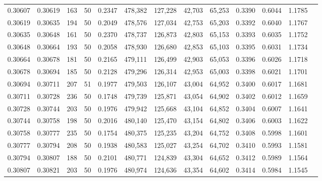 \begin{tabular}{rrrrrrrrrrrrr}
0.30607 & 0.30619 &   163 &  50 &                                     0.2347 & 478,382 & 127,228 &  42,703 &  65,253 & 0.3390 & 0.6044 & 1.1785 \\
0.30619 & 0.30635 &   194 &  50 &                                     0.2049 & 478,576 & 127,034 &  42,753 &  65,203 & 0.3392 & 0.6040 & 1.1767 \\
0.30635 & 0.30648 &   161 &  50 &                                     0.2370 & 478,737 & 126,873 &  42,803 &  65,153 & 0.3393 & 0.6035 & 1.1752 \\
0.30648 & 0.30664 &   193 &  50 &                                     0.2058 & 478,930 & 126,680 &  42,853 &  65,103 & 0.3395 & 0.6031 & 1.1734 \\
0.30664 & 0.30678 &   181 &  50 &                                     0.2165 & 479,111 & 126,499 &  42,903 &  65,053 & 0.3396 & 0.6026 & 1.1718 \\
0.30678 & 0.30694 &   185 &  50 &                                     0.2128 & 479,296 & 126,314 &  42,953 &  65,003 & 0.3398 & 0.6021 & 1.1701 \\
0.30694 & 0.30711 &   207 &  51 &                                     0.1977 & 479,503 & 126,107 &  43,004 &  64,952 & 0.3400 & 0.6017 & 1.1681 \\
0.30711 & 0.30728 &   236 &  50 &                                     0.1748 & 479,739 & 125,871 &  43,054 &  64,902 & 0.3402 & 0.6012 & 1.1659 \\
0.30728 & 0.30744 &   203 &  50 &                                     0.1976 & 479,942 & 125,668 &  43,104 &  64,852 & 0.3404 & 0.6007 & 1.1641 \\
0.30744 & 0.30758 &   198 &  50 &                                     0.2016 & 480,140 & 125,470 &  43,154 &  64,802 & 0.3406 & 0.6003 & 1.1622 \\
0.30758 & 0.30777 &   235 &  50 &                                     0.1754 & 480,375 & 125,235 &  43,204 &  64,752 & 0.3408 & 0.5998 & 1.1601 \\
0.30777 & 0.30794 &   208 &  50 &                                     0.1938 & 480,583 & 125,027 &  43,254 &  64,702 & 0.3410 & 0.5993 & 1.1581 \\
0.30794 & 0.30807 &   188 &  50 &                                     0.2101 & 480,771 & 124,839 &  43,304 &  64,652 & 0.3412 & 0.5989 & 1.1564 \\
0.30807 & 0.30821 &   203 &  50 &                                     0.1976 & 480,974 & 124,636 &  43,354 &  64,602 & 0.3414 & 0.5984 & 1.1545 \\

\end{tabular}
